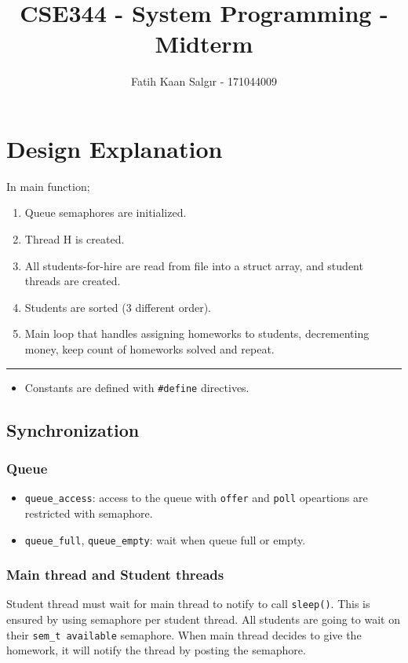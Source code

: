 \documentclass[a4paper]{article}
\author{Fatih Kaan Salgır - 171044009}
\date{}
\title{CSE344 - System Programming - Midterm}
\begin{document}
\maketitle

\section*{Design Explanation}
\label{sec:org6a465cb}

In main function;
\begin{enumerate}
\item Queue semaphores are initialized.
\item Thread H is created.
\item All students-for-hire are read from file into a struct array, and student threads are created.
\item Students are sorted (3 different order).
\item Main loop that handles assigning homeworks to students, decrementing money, keep count of homeworks solved and repeat.
\end{enumerate}

\noindent\rule{\textwidth}{0.5pt}

\begin{itemize}
\item Constants are defined with \texttt{\#define} directives.
\end{itemize}

\subsection*{Synchronization}
\label{sec:org2848a26}

\subsubsection*{Queue}
\label{sec:org4d7b2c7}
\begin{itemize}
\item \texttt{queue\_access}: access to the queue with \texttt{offer} and \texttt{poll} opeartions are restricted with semaphore.
\item \texttt{queue\_full}, \texttt{queue\_empty}: wait when queue full or empty.
\end{itemize}

\subsubsection*{Main thread and Student threads}
\label{sec:orgbf0ad67}
Student thread must wait for main thread to notify to call \texttt{sleep()}. This is ensured by using semaphore per student thread. All students are going to wait on their \texttt{sem\_t available} semaphore. When main thread decides to give the homework, it will notify the thread by posting the semaphore.
\end{document}
